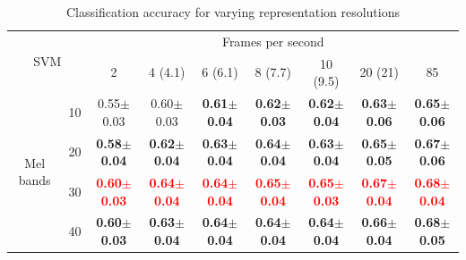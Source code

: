 \documentclass[final,3p,times,twocolumn]{elsarticle}
\begin{document}
\begin{table}[h]
\centering
\caption{Classification accuracy for varying representation resolutions}
\label{T1}
\begin{tabular}{ll|c|c|c|c|c|c|c|} 
\cline{3-9}
\multicolumn{2}{c}{\multirow{2}{*}{SVM}} & \multicolumn{7}{|c|}{Frames per second}\\ \cline{3-9}
 & & 2 & 4 (4.1) & 6 (6.1) & 8 (7.7) & 10 (9.5) & 20 (21) & 85 \\ \cline{1-9} 
\multicolumn{1}{|c}{\multirow{4}{*}{Mel bands}}
 & \multicolumn{1}{|c|}{10} & 0.55$\pm$0.03 & 0.60$\pm$0.03 & \textbf{0.61$\pm$0.04} & \textbf{0.62$\pm$0.03} & \textbf{0.62$\pm$0.04} & \textbf{0.63$\pm$0.06} & \textbf{0.65$\pm$0.06} \\ \cline{2-9}
\multicolumn{1}{|c}{}
 & \multicolumn{1}{|c|}{20} & \textbf{0.58$\pm$0.04} & \textbf{0.62$\pm$0.04} & \textbf{0.63$\pm$0.04} & \textbf{0.64$\pm$0.04} & \textbf{0.63$\pm$0.04} & \textbf{0.65$\pm$0.05} & \textbf{0.67$\pm$0.06} \\ \cline{2-9}
\multicolumn{1}{|c}{}
 & \multicolumn{1}{|c|}{30} & \textbf{\textcolor{red}{0.60$\pm$0.03}} & \textbf{\textcolor{red}{0.64$\pm$0.04}} & \textbf{\textcolor{red}{0.64$\pm$0.04}} & \textbf{\textcolor{red}{0.65$\pm$0.04}} & \textbf{\textcolor{red}{0.65$\pm$0.03}} & \textbf{\textcolor{red}{0.67$\pm$0.04}} & \textbf{\textcolor{red}{0.68$\pm$0.04}} \\ \cline{2-9}
\multicolumn{1}{|c}{}
 & \multicolumn{1}{|c|}{40} & \textbf{0.60$\pm$0.03} & \textbf{0.63$\pm$0.04} & \textbf{0.64$\pm$0.04} & \textbf{0.64$\pm$0.04} & \textbf{0.64$\pm$0.04} & \textbf{0.66$\pm$0.04} & \textbf{0.68$\pm$0.05} \\ \cline{1-9}
\end{tabular} 


\end{table}
\end{document}
